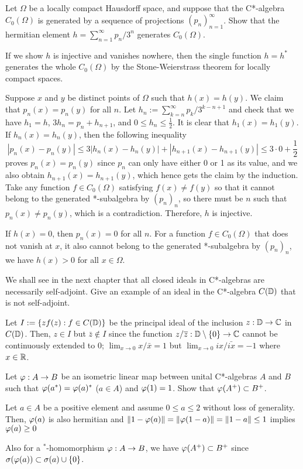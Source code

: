 \documentclass{article}
\begin{document}
\begin{prb}
Let $\Omega$ be a locally compact Hausdorff space, and suppose that the C*-algebra $C_0(\Omega)$ is generated by a sequence of projections $(p_n)_{n=1}^\infty$.
Show that the hermitian element $h=\sum_{n=1}^\infty p_n/3^n$ generates $C_0(\Omega)$.
\end{prb}
\begin{sol}
If we show $h$ is injective and vanishes nowhere, then the single function $h=h^*$ generates the whole $C_0(\Omega)$ by the Stone-Weierstrass theorem for locally compact spaces.

Suppose $x$ and $y$ be distinct points of $\Omega$ such that $h(x)=h(y)$.
We claim that $p_n(x)=p_n(y)$ for all $n$.
Let $h_n:=\sum_{k=n}^\infty p_k/3^{k-n+1}$ and check that we have $h_1=h$, $3h_n=p_n+h_{n+1}$, and $0\le h_n\le\frac12$.
It is clear that $h_1(x)=h_1(y)$.
If $h_n(x)=h_n(y)$, then the following inequality
\[|p_n(x)-p_n(y)|\le3|h_n(x)-h_n(y)|+|h_{n+1}(x)-h_{n+1}(y)|\le3\cdot0+\frac12\]
proves $p_n(x)=p_n(y)$ since $p_n$ can only have either 0 or 1 as its value, and we also obtain $h_{n+1}(x)=h_{n+1}(y)$, which hence gets the claim by the induction.
Take any function $f\in C_0(\Omega)$ satisfying $f(x)\ne f(y)$ so that it cannot belong to the generated *-subalgebra by $(p_n)_n$, so there must be $n$ such that $p_n(x)\ne p_n(y)$, which is a contradiction.
Therefore, $h$ is injective.

If $h(x)=0$, then $p_n(x)=0$ for all $n$.
For a function $f\in C_0(\Omega)$ that does not vanish at $x$, it also cannot belong to the generated *-subalgebra by $(p_n)_n$, we have $h(x)>0$ for all $x\in\Omega$.
\end{sol}


\begin{prb}
We shall see in the next chapter that all closed ideals in C*-algebras are necessarily self-adjoint.
Give an example of an ideal in the C*-algebra $C(\mathbb{D})$ that is not self-adjoint.
\end{prb}
\begin{sol}
Let $I:=\{zf(z):f\in C(\mathbb{D})\}$ be the principal ideal of the inclusion $z:\mathbb{D}\to\mathbb{C}$ in $C(\mathbb{D})$.
Then, $z\in I$ but $\bar z\notin I$ since the function $z/\overline z:\mathbb{D}\setminus\{0\}\to\mathbb{C}$ cannot be continuously extended to 0; $\lim_{x\to0}x/\bar{x}=1$ but $\lim_{x\to0}ix/\bar{ix}=-1$ where $x\in\mathbb{R}$.
\end{sol}


\begin{prb}
Let $\varphi:A\to B$ be an isometric linear map between unital C*-algebras $A$ and $B$ such that $\varphi(a^*)=\varphi(a)^*$ ($a\in A$) and $\varphi(1)=1$.
Show that $\varphi(A^+)\subset B^+$.
\end{prb}
\begin{sol}
Let $a\in A$ be a positive element and assume $0\le a\le2$ without loss of generality.
Then, $\varphi(a)$ is also hermitian and $\|1-\varphi(a)\|=\|\varphi(1-a)\|=\|1-a\|\le1$ implies $\varphi(a)\ge0$
\end{sol}
\begin{rmk}
Also for a $^*$-homomorphism $\varphi:A\to B$, we have $\varphi(A^+)\subset B^+$ since $\sigma(\varphi(a))\subset\sigma(a)\cup\{0\}$.
\end{rmk}
\end{document}
